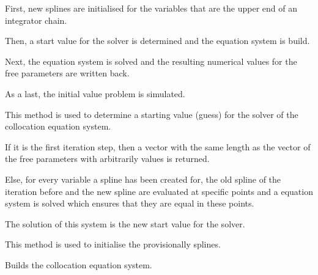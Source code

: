 \documentclass[letterpaper,10pt,english]{sphinxmanual}
\begin{document}
\begin{fulllineitems}
\begin{fulllineitems}
First, new splines are initialised for the variables that are the upper
end of an integrator chain.

Then, a start value for the solver is determined and the equation
system is build.

Next, the equation system is solved and the resulting numerical values
for the free parameters are written back.

As a last, the initial value problem is simulated.

\end{fulllineitems}


\begin{fulllineitems}
\label{pytrajectory:pytrajectory.trajectory.Trajectory.getGuess}
This method is used to determine a starting value (guess) for the
solver of the collocation equation system.

If it is the first iteration step, then a vector with the same length as
the vector of the free parameters with arbitrarily values is returned.

Else, for every variable a spline has been created for, the old spline
of the iteration before and the new spline are evaluated at specific
points and a equation system is solved which ensures that they are equal
in these points.

The solution of this system is the new start value for the solver.

\end{fulllineitems}


\begin{fulllineitems}
\label{pytrajectory:pytrajectory.trajectory.Trajectory.initSplines}
This method is used to initialise the provisionally splines.

\end{fulllineitems}


\begin{fulllineitems}
\label{pytrajectory:pytrajectory.trajectory.Trajectory.buildEQS}
Builds the collocation equation system.

\end{fulllineitems}


\end{fulllineitems}
\end{document}
